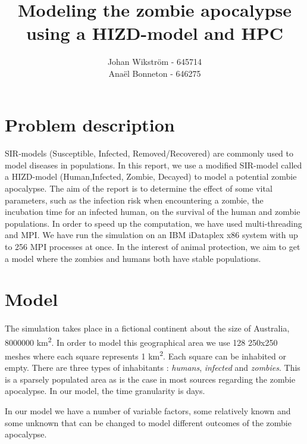 \documentclass{report}
\begin{document}
\title{Modeling the zombie apocalypse using a HIZD-model and HPC}
\author{Johan Wikström - 645714 \\
        Anaël Bonneton - 646275}
\maketitle
\tableofcontents
\newpage
\section{Problem description}	

\paragraph{}
SIR-models (Susceptible, Infected, Removed/Recovered) are commonly used to model diseases in populations. In this report, we use a modified SIR-model called a HIZD-model (Human,Infected, Zombie, Decayed) to model a potential zombie apocalypse. The aim of the report is to determine the effect of some vital parameters, such as the infection risk when encountering a zombie, the incubation time for an infected human, on the survival of the human and zombie populations. In order to speed up the computation, we have used multi-threading and MPI\cite{openmpi}. We have run the simulation on an IBM iDataplex x86 system with up to 256 MPI processes at once. In the interest of animal protection, we aim to get a model where the zombies and humans both have stable populations.

\section{Model}

\paragraph{}
The simulation takes place in a fictional continent about the size of Australia, 8000000 km\textsuperscript{2}. In order to model this geographical area we use 128 250x250 meshes where each square represents 1 km\textsuperscript{2}. Each square can be inhabited or empty. There are three types of inhabitants : \emph{humans}, \emph{infected} and \emph{zombies}. This is a sparsely populated area as is the case in most sources regarding the zombie apocalypse\cite{zombieland}. In our model, the time granularity is days.

In our model we have a number of variable factors, some relatively known and some unknown that can be changed to model different outcomes of the zombie apocalypse.
\end{document}
